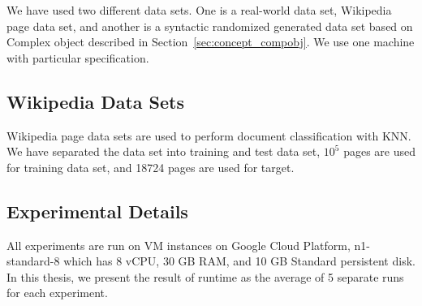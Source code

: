 We have used two different data sets. One is a real-world data set, Wikipedia page data set,
and another is a syntactic randomized generated data set based on Complex object described in Section~\ref{sec:concept_compobj}. 
We use one machine with particular specification.
\subsection{Wikipedia Data Sets}
 \label{sec:concept_dataset}
 Wikipedia page data sets are used to perform document classification with KNN. 
 We have separated the data set into training and test data set, 
 \(10^5\) pages are used for training data set, and 18724 pages are used for target.

 \subsection{Experimental Details}
 \label{sec:concept_expdetail}
 All experiments are run on VM instances on Google Cloud Platform, 
 n1-standard-8 which has 8 vCPU, 30 GB RAM, and 10 GB Standard persistent disk.
 In this thesis, we present the result of runtime as the average of 5 separate runs for each experiment.